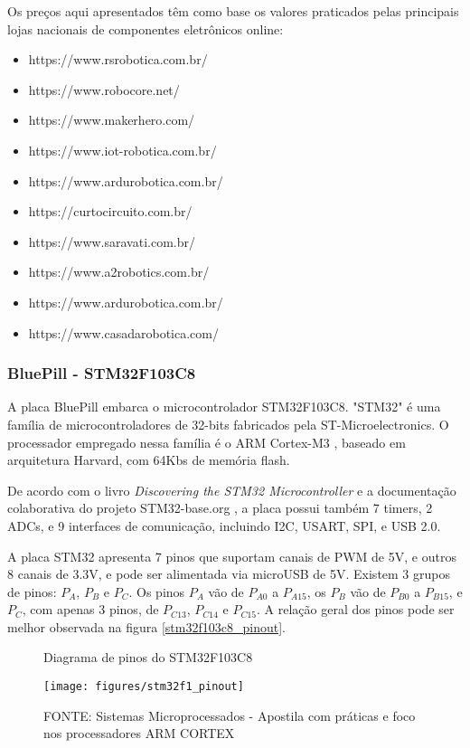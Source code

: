 Os preços aqui apresentados têm como base os valores praticados pelas principais
lojas nacionais de componentes eletrônicos online:
\begin{itemize}
	\item https://www.rsrobotica.com.br/
	\item https://www.robocore.net/
	\item https://www.makerhero.com/
	\item https://www.iot-robotica.com.br/
	\item https://www.ardurobotica.com.br/
	\item https://curtocircuito.com.br/
	\item https://www.saravati.com.br/
	\item https://www.a2robotics.com.br/
	\item https://www.ardurobotica.com.br/
	\item https://www.casadarobotica.com/
\end{itemize}



\subsubsection{BluePill - STM32F103C8}

A placa BluePill embarca o microcontrolador STM32F103C8.
"STM32" é uma família de microcontroladores de 32-bits fabricados pela
ST-Microelectronics. O processador empregado nessa família é o ARM Cortex-M3
\cite{cortex_m3}, baseado em arquitetura Harvard, com 64Kbs de memória flash.

De acordo com o livro \textit{Discovering the STM32 Microcontroller}
\cite{stm_doc} e a documentação colaborativa do projeto STM32-base.org
\cite{stm32_base_org}, a placa possui também 7 timers, 2 ADCs, e 9 interfaces de
comunicação, incluindo I2C,  USART, SPI, e USB 2.0.

A placa STM32 apresenta 7 pinos que suportam canais de PWM de 5V, e outros 8
canais de 3.3V, e pode ser alimentada via microUSB de 5V. Existem 3 grupos de
pinos: $P_{A}$, $P_{B}$ e $P_{C}$. Os pinos $P_{A}$ vão de $P_{A0}$ 
a $P_{A15}$, os $P_{B}$ vão de $P_{B0}$ a $P_{B15}$, e $P_{C}$, com apenas 3
pinos, de $P_{C13}$, $P_{C14}$ e $P_{C15}$.
A relação geral dos pinos pode ser melhor observada na figura 
\autoref{stm32f103c8_pinout}.

\begin{figure}[ht]
	\centering
	\caption{Diagrama de pinos do STM32F103C8}
	\texttt{[image: figures/stm32f1\_pinout]}
	\caption*{FONTE: Sistemas Microprocessados - Apostila com práticas e foco nos processadores ARM CORTEX \cite{apostila_microprossados}}
    \label{stm32f103c8_pinout}
\end{figure}

